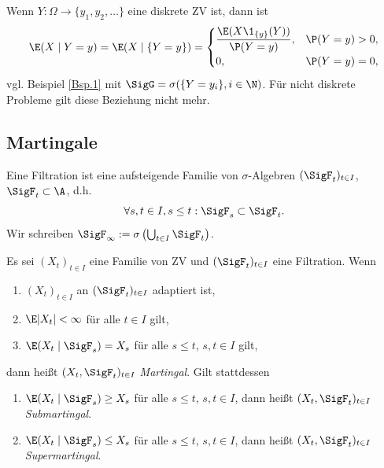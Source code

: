\documentclass[11pt, a4paper]{article}
\begin{document}
\begin{example}
    Wenn $Y: \Omega \to \{y_1, y_2, \dots\}$ eine diskrete ZV ist, dann ist
    $$\E(X \mid Y = y) = \E(X \mid \{Y = y\}) = \begin{cases} \dfrac{\E(X \1_{\{y\}}(Y))}{\P(Y=y)}, & \P(Y=y) > 0, \\[2mm] 0, & \P(Y=y) = 0, \end{cases}$$
    vgl. Beispiel \ref{Bsp.1} mit $\SigG = \sigma(\{Y = y_i\}, i \in \N)$. Für nicht diskrete Probleme gilt diese Beziehung nicht mehr.
\end{example}

\subsection{Martingale}

\begin{definition}[Filtration]
    Eine Filtration ist eine aufsteigende Familie von $\sigma$-Algebren $(\SigF_t)_{t \in I}$, $\SigF_t \subset \A$, d.h.
    $$\forall s, t \in I, s \le t: \SigF_s \subset \SigF_t.$$
    Wir schreiben $\SigF_\infty := \sigma\left(\bigcup_{t \in I} \SigF_t\right)$.
\end{definition}


\begin{definition}[Martingale] \Theorem
    Es sei $(X_t)_{t \in I}$ eine Familie von ZV und $(\SigF_t)_{t \in I}$ eine Filtration. Wenn
    \begin{enumerate}[label=\alph*)]
        \item $(X_t)_{t \in I}$ an $(\SigF_t)_{t \in I}$ adaptiert ist,
        \item $\E|X_t| < \infty$ für alle $t \in I$ gilt,
        \item $\E(X_t \mid \SigF_s) = X_s$ für alle $s \le t$, $s, t \in I$ gilt,
    \end{enumerate}
    dann heißt $(X_t, \SigF_t)_{t \in I}$ \emph{Martingal}. Gilt stattdessen
    \begin{enumerate}[label=c\arabic*)]
        \setcounter{enumii}{0}
        \item[c')] $\E(X_t \mid \SigF_s) \ge X_s$ für alle $s \le t$, $s, t \in I$, dann heißt $(X_t, \SigF_t)_{t \in I}$ \newline \emph{Submartingal}.
        \item[c'')] $\E(X_t \mid \SigF_s) \le X_s$ für alle $s \le t$, $s, t \in I$, dann heißt $(X_t, \SigF_t)_{t \in I}$ \newline \emph{Supermartingal}.
    \end{enumerate}
\end{definition}
\end{document}
